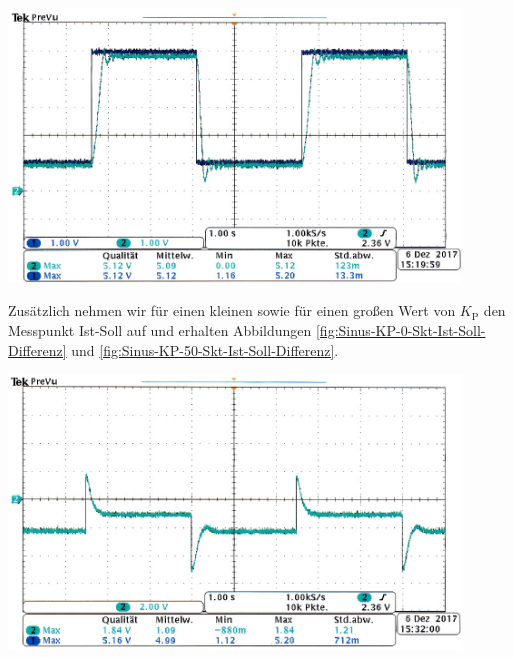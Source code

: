     \begin{center}
        \captionsetup{type=figure}
        \begin{adjustbox}{max width=\linewidth, keepaspectratio}
            \includegraphics[width=120mm]{jpg/Sinus-KP-50-Skt}
        \end{adjustbox}
        \label{fig:Sinus-KP-50-Skt}
    \end{center}
\endminipage
%
\par
%
Zusätzlich nehmen wir für einen kleinen sowie für einen großen Wert von $K_{\text{P}}$ den Messpunkt Ist-Soll auf und erhalten Abbildungen \ref{fig:Sinus-KP-0-Skt-Ist-Soll-Differenz} und \ref{fig:Sinus-KP-50-Skt-Ist-Soll-Differenz}.
%
\par
%
\minipage{\linewidth}
    \begin{center}
        \captionsetup{type=figure}
        \begin{adjustbox}{max width=\linewidth, keepaspectratio}
            \includegraphics[width=120mm]{jpg/Sinus-KP-0-Skt-Ist-Soll-Differenz}
        \end{adjustbox}
        \label{fig:Sinus-KP-0-Skt-Ist-Soll-Differenz}
    \end{center}
